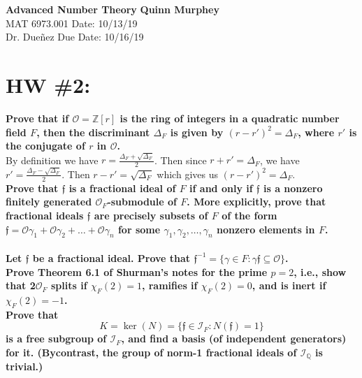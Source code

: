 \documentclass[letterpaper, 12pt]{article}
\begin{document}
\noindent
\large\textbf{Advanced Number Theory} \hfill \textbf{Quinn Murphey} \\
\normalsize MAT 6973.001 \hfill Date: 10/13/19 \\
Dr. Dueñez \hfill Due Date: 10/16/19 \\
\noindent\makebox[\linewidth]{\rule{\paperwidth}{0.4pt}}
\section*{HW \#2:}
 

\textbf{Prove that if $\mathcal{O} = \mathbb{Z}[r]$ is the ring of integers in a quadratic number field $F$, then the discriminant $\Delta_F$ is given by $(r-r')^2=\Delta_F$, where $r'$ is the conjugate of $r$ in $\mathcal{O}$.}\\

    By definition we have $r = \frac{\Delta_F + \sqrt{\Delta_F}}{2}$. Then since $r + r' = \Delta_F$, we have $r'=\frac{\Delta_F-\sqrt{\Delta_F}}{2}$. Then $r-r' = \sqrt{\Delta_F}$ which gives us $(r-r')^2=\Delta_F$.\\

\noindent\textbf{Prove that $\mathfrak{f}$ is a fractional ideal of $F$ if and only if $\mathfrak{f}$ is a nonzero finitely generated $\mathcal{O}_F$-submodule of $F$. More explicitly, prove that fractional ideals $\mathfrak{f}$ are precisely subsets of $F$ of the form $\mathfrak{f} = \mathcal{O}\gamma_1 + \mathcal{O}\gamma_2 + \dots + \mathcal{O}\gamma_n$ for some $\gamma_1,\gamma_2,\dots,\gamma_n$ nonzero elements in $F$.}\\

    \\

\noindent\textbf{Let $\mathfrak{f}$ be a fractional ideal. Prove that $\mathfrak{f}^{-1} = \{\gamma\in F : \gamma\mathfrak{f}\subseteq\mathcal{O}\}$.}\\



\noindent\textbf{Prove Theorem 6.1 of Shurman’s notes for the prime $p = 2$, i.e., show that 2$\mathcal{O}_F$ splits if $\chi_F(2) = 1$, ramifies if $\chi_F(2) = 0$, and is inert if $\chi_F(2) = -1$.}\\

    

\noindent\textbf{Prove that
$$K = \ker(N) = \{\mathfrak{f}\in \mathcal{I}_F : N(\mathfrak{f}) = 1\}$$ is a free subgroup of $\mathcal{I}_F$, and find a basis (of independent generators) for it. (Bycontrast, the group of norm-1 fractional ideals of $\mathcal{I}_\mathbb{Q}$ is trivial.)}\\

    
\end{document}
